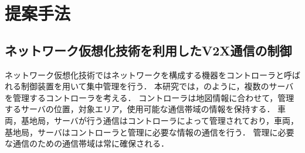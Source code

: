 \documentclass[a4paper,10pt,twocolumn,uplatex]{jsarticle}
\begin{document}

\section{提案手法}
\subsection{ネットワーク仮想化技術を利用したV2X通信の制御}
ネットワーク仮想化技術ではネットワークを構成する機器をコントローラと呼ばれる制御装置を用いて集中管理を行う．
本研究では，のように，複数のサーバを管理するコントローラを考える．
コントローラは地図情報に合わせて，管理するサーバの位置，対象エリア，使用可能な通信帯域の情報を保持する．
車両，基地局，サーバが行う通信はコントローラによって管理されており，車両，基地局，サーバはコントローラと管理に必要な情報の通信を行う．
管理に必要な通信のための通信帯域は常に確保される．
\end{document}

